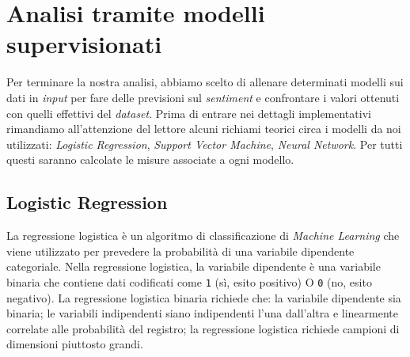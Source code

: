 \chapter{Analisi tramite modelli supervisionati}
		Per terminare la nostra analisi, abbiamo scelto di allenare determinati modelli sui dati in \textit{input} per fare delle previsioni sul \textit{sentiment} e confrontare i valori ottenuti con quelli effettivi del \textit{dataset}. Prima di entrare nei dettagli implementativi rimandiamo all'attenzione del lettore alcuni richiami teorici circa i modelli da noi utilizzati: \textit{Logistic Regression}, \textit{Support Vector Machine}, \textit{Neural Network}. Per tutti questi saranno calcolate le misure associate a ogni modello.
		
			
		\section{Logistic Regression}
			La regressione logistica è un algoritmo di classificazione di \textit{Machine Learning} che viene utilizzato per prevedere la probabilità di una variabile dipendente categoriale. Nella regressione logistica, la variabile dipendente è una variabile binaria che contiene dati codificati come \verb|1| (sì, esito positivo) O \verb|0| (no, esito negativo). La regressione logistica binaria richiede che: la variabile dipendente sia binaria; le variabili indipendenti siano indipendenti l'una dall'altra e linearmente correlate alle probabilità del registro; la regressione logistica richiede campioni di dimensioni piuttosto grandi.
			
